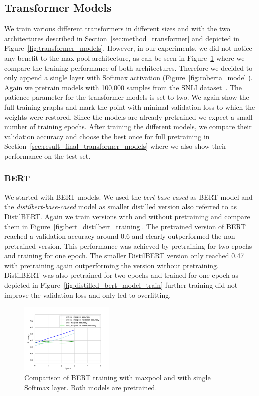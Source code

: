 \documentclass[acmsmall,nonacm]{acmart}
\begin{document}
\subsection{Transformer Models} \label{sec:results_transformer}
We train various different transformers in different sizes and with the two architectures described in Section~\ref{sec:method_transformer} and depicted in Figure~\ref{fig:transformer_models}. However, in our experiments, we did not notice any benefit to the max-pool architecture, as can be seen in Figure~\ref{fig:bert_maxpool_training} where we compare the training performance of both architectures. Therefore we decided to only append a single layer with Softmax activation (Figure~\ref{fig:roberta_model}). Again we pretrain models with 100,000 samples from the SNLI dataset~\cite{snli-bowman2015}. The patience parameter for the transformer models is set to two. We again show the full training graphs and mark the point with minimal validation loss to which the weights were restored. Since the models are already pretrained we expect a small number of training epochs. After training the different models, we compare their validation accuracy and choose the best once for full pretraining in Section~\ref{sec:result_final_transformer_models} where we also show their performance on the test set.

\subsubsection{BERT}
We started with BERT models. We used the \textit{bert-base-cased} as BERT model and the \textit{distilbert-base-cased} model as smaller distilled version also referred to as DistilBERT. Again we train versions with and without pretraining and compare them in Figure~\ref{fig:bert_distilbert_training}. The pretrained version of BERT reached a validation accuracy around 0.6 and clearly outperformed the non-pretrained version. This performance was achieved by pretraining for two epochs and training for one epoch. The smaller DistilBERT version only reached 0.47 with pretraining again outperforming the version without pretraining. DistilBERT was also pretrained for two epochs and trained for one epoch as depicted in Figure~\ref{fig:distilled_bert_model_train} further training did not improve the validation loss and only led to overfitting. 

\begin{figure}[h!]
  \includegraphics[width=0.4\textwidth]{assets/bert-base-cased_comparison_without_maxpool_with_maxpool.png}
  \caption{Comparison of BERT training with maxpool and with single Softmax layer. Both models are pretrained.}
  \label{fig:bert_maxpool_training}
\end{figure}
\end{document}
